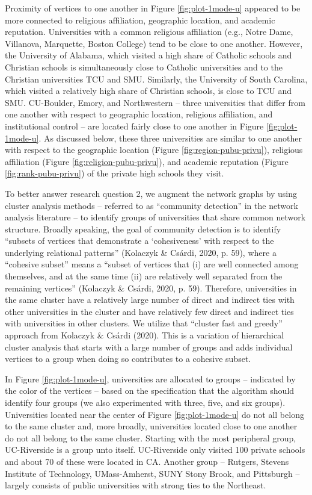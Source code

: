\documentclass[
  12pt,
]{article}
\begin{document}
Proximity of vertices to one another in Figure \ref{fig:plot-1mode-u} appeared to be more connected to religious affiliation, geographic location, and academic reputation. Universities with a common religious affiliation (e.g., Notre Dame, Villanova, Marquette, Boston College) tend to be close to one another. However, the University of Alabama, which visited a high share of Catholic schools and Christian schools is simultaneously close to Catholic universities and to the Christian universities TCU and SMU. Similarly, the University of South Carolina, which visited a relatively high share of Christian schools, is close to TCU and SMU. CU-Boulder, Emory, and Northwestern -- three universities that differ from one another with respect to geographic location, religious affiliation, and institutional control -- are located fairly close to one another in Figure \ref{fig:plot-1mode-u}. As discussed below, these three universities are similar to one another with respect to the geographic location (Figure \ref{fig:region-pubu-privu}), religious affiliation (Figure \ref{fig:religion-pubu-privu}), and academic reputation (Figure \ref{fig:rank-pubu-privu}) of the private high schools they visit.

To better answer research question 2, we augment the network graphs by using cluster analysis methods -- referred to as ``community detection'' in the network analysis literature -- to identify groups of universities that share common network structure. Broadly speaking, the goal of community detection is to identify ``subsets of vertices that demonstrate a `cohesiveness' with respect to the underlying relational patterns'' (Kolaczyk \& Csárdi, 2020, p. 59), where a ``cohesive subset'' means a ``subset of vertices that (i) are well connected among themselves, and at the same time (ii) are relatively well separated from the remaining vertices'' (Kolaczyk \& Csárdi, 2020, p. 59). Therefore, universities in the same cluster have a relatively large number of direct and indirect ties with other universities in the cluster and have relatively few direct and indirect ties with universities in other clusters. We utilize that ``cluster fast and greedy'' approach from Kolaczyk \& Csárdi (2020). This is a variation of hierarchical cluster analysis that starts with a large number of groups and adds individual vertices to a group when doing so contributes to a cohesive subset.

In Figure \ref{fig:plot-1mode-u}, universities are allocated to groups -- indicated by the color of the vertices -- based on the specification that the algorithm should identify four groups (we also experimented with three, five, and six groups). Universities located near the center of Figure \ref{fig:plot-1mode-u} do not all belong to the same cluster and, more broadly, universities located close to one another do not all belong to the same cluster. Starting with the most peripheral group, UC-Riverside is a group unto itself. UC-Riverside only visited 100 private schools and about 70 of these were located in CA. Another group -- Rutgers, Stevens Institute of Technology, UMass-Amherst, SUNY Stony Brook, and Pittsburgh -- largely consists of public universities with strong ties to the Northeast.
\end{document}
